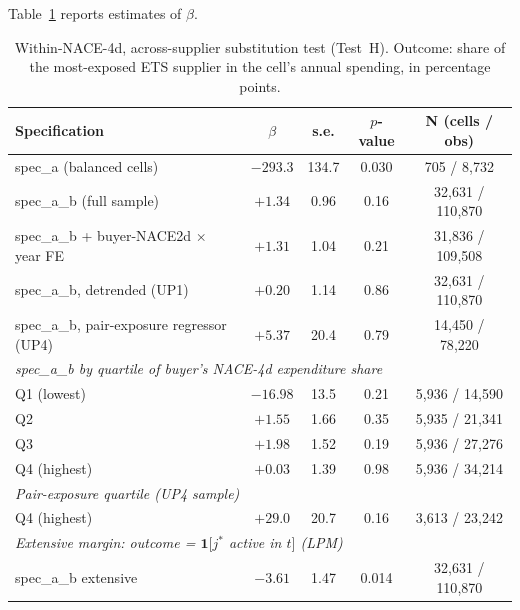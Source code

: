 Table~\ref{tab:test_h_main} reports estimates of $\beta$.

\begin{table}[H]
    \centering
    \caption{Within-NACE-4d, across-supplier substitution test (Test~H). Outcome: share of the most-exposed ETS supplier in the cell's annual spending, in percentage points.}
    \label{tab:test_h_main}
    \begin{tabular}{lcccc}
        \toprule
        Specification & $\beta$ & s.e. & $p$-value & N (cells / obs) \\
        \midrule
        spec\_a (balanced cells)               & $-293.3$ & 134.7 & 0.030    & 705 / 8{,}732 \\
        spec\_a\_b (full sample)               & $+1.34$  & 0.96  & 0.16     & 32{,}631 / 110{,}870 \\
        spec\_a\_b + buyer-NACE2d $\times$ year FE & $+1.31$  & 1.04  & 0.21     & 31{,}836 / 109{,}508 \\
        spec\_a\_b, detrended (UP1)            & $+0.20$  & 1.14  & 0.86     & 32{,}631 / 110{,}870 \\
        spec\_a\_b, pair-exposure regressor (UP4) & $+5.37$ & 20.4  & 0.79     & 14{,}450 / 78{,}220 \\
        \midrule
        \multicolumn{5}{l}{\emph{spec\_a\_b by quartile of buyer's NACE-4d expenditure share}} \\
        Q1 (lowest)                            & $-16.98$ & 13.5  & 0.21     & 5{,}936 / 14{,}590 \\
        Q2                                     & $+1.55$  & 1.66  & 0.35     & 5{,}935 / 21{,}341 \\
        Q3                                     & $+1.98$  & 1.52  & 0.19     & 5{,}936 / 27{,}276 \\
        Q4 (highest)                           & $+0.03$  & 1.39  & 0.98     & 5{,}936 / 34{,}214 \\
        \midrule
        \multicolumn{5}{l}{\emph{Pair-exposure quartile (UP4 sample)}} \\
        Q4 (highest)                           & $+29.0$  & 20.7  & 0.16     & 3{,}613 / 23{,}242 \\
        \midrule
        \multicolumn{5}{l}{\emph{Extensive margin: outcome = $\mathbf{1}[j^*$ active in $t]$ (LPM)}} \\
        spec\_a\_b extensive                   & $-3.61$  & 1.47  & 0.014    & 32{,}631 / 110{,}870 \\
        \bottomrule
    \end{tabular}
\end{table}

